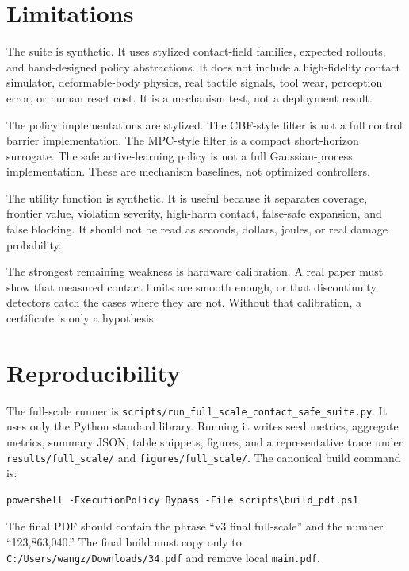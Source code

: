 \documentclass{article}
\begin{document}
\section{Limitations}

The suite is synthetic. It uses stylized contact-field families, expected
rollouts, and hand-designed policy abstractions. It does not include a
high-fidelity contact simulator, deformable-body physics, real tactile
signals, tool wear, perception error, or human reset cost. It is a mechanism
test, not a deployment result.

The policy implementations are stylized. The CBF-style filter is not a full
control barrier implementation. The MPC-style filter is a compact short-horizon
surrogate. The safe active-learning policy is not a full Gaussian-process
implementation. These are mechanism baselines, not optimized controllers.

The utility function is synthetic. It is useful because it separates coverage,
frontier value, violation severity, high-harm contact, false-safe expansion,
and false blocking. It should not be read as seconds, dollars, joules, or real
damage probability.

The strongest remaining weakness is hardware calibration. A real paper must
show that measured contact limits are smooth enough, or that discontinuity
detectors catch the cases where they are not. Without that calibration, a
certificate is only a hypothesis.

\section{Reproducibility}

The full-scale runner is
\texttt{scripts/run\_full\_scale\_contact\_safe\_suite.py}. It uses only the
Python standard library. Running it writes seed metrics, aggregate metrics,
summary JSON, table snippets, figures, and a representative trace under
\texttt{results/full\_scale/} and \texttt{figures/full\_scale/}. The canonical
build command is:

\begin{verbatim}
powershell -ExecutionPolicy Bypass -File scripts\build_pdf.ps1
\end{verbatim}

The final PDF should contain the phrase ``v3 final full-scale'' and the number
``123,863,040.'' The final build must copy only to
\texttt{C:/Users/wangz/Downloads/34.pdf} and remove local \texttt{main.pdf}.
\end{document}
